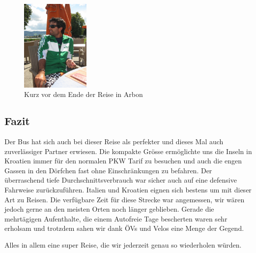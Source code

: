 \begin{figure}[H]
    \centering
    \includegraphics[width=0.3\textwidth]{../Bilder/Sommer2012/107.jpg}
    \caption{Kurz vor dem Ende der Reise in Arbon}
    \label{img:Sommer12}
\end{figure}

\subsection{Fazit}

Der Bus hat sich auch bei dieser Reise als perfekter und dieses Mal auch zuverlässiger Partner erwiesen.
Die kompakte Grösse ermöglichte uns die Inseln in Kroatien immer für den normalen PKW Tarif zu besuchen und auch die engen Gassen in den Dörfchen fast ohne Einschränkungen zu befahren.
Der überraschend tiefe Durchschnittsverbrauch war sicher auch auf eine defensive Fahrweise zurückzuführen.
Italien und Kroatien eignen sich bestens um mit dieser Art zu Reisen.
Die verfügbare Zeit für diese Strecke war angemessen, wir wären jedoch gerne an den meisten Orten noch länger geblieben.
Gerade die mehrtägigen Aufenthalte, die einem Autofreie Tage bescherten waren sehr erholsam und trotzdem sahen wir dank ÖVs und Velos eine Menge der Gegend.

Alles in allem eine super Reise, die wir jederzeit genau so wiederholen würden.

